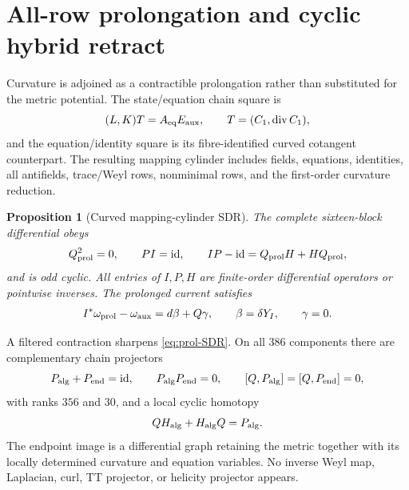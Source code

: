 \documentclass[11pt]{article}
\newtheorem{proposition}[theorem]{Proposition}
\theoremstyle{definition}
\theoremstyle{remark}
\newcommand{\id}{\mathrm{id}}
\begin{document}
\section{All-row prolongation and cyclic hybrid retract}
\label{sec:mapping-cylinder}

Curvature is adjoined as a contractible prolongation rather than substituted
for the metric potential.  The state/equation chain square is
\begin{equation}\label{eq:chain-square}
 (L,K)T=A_{\rm eq}E_{\rm aux},
 \qquad T=(C_1,\operatorname{div}C_1),
\end{equation}
and the equation/identity square is its fibre-identified curved cotangent
counterpart.  The resulting mapping cylinder includes fields, equations,
identities, all antifields, trace/Weyl rows, nonminimal rows, and the
first-order curvature reduction.

\begin{proposition}[Curved mapping-cylinder SDR]\label{prop:cylinder-SDR}
The complete sixteen-block differential obeys
\begin{equation}\label{eq:prol-SDR}
 Q_{\rm prol}^2=0,
 \qquad PI=\id,
 \qquad IP-\id=Q_{\rm prol}H+HQ_{\rm prol},
\end{equation}
and is odd cyclic.  All entries of $I,P,H$ are finite-order differential
operators or pointwise inverses.  The prolonged current satisfies
\begin{equation}\label{eq:prolonged-current}
 I^*\omega_{\rm prol}-\omega_{\rm aux}=d\beta+Q\gamma,
 \qquad \beta=\delta Y_I,
 \qquad \gamma=0.
\end{equation}
\end{proposition}

A filtered contraction sharpens \eqref{eq:prol-SDR}.  On all $386$
components there are complementary chain projectors
\begin{equation}\label{eq:hybrid-projectors}
 P_{\rm alg}+P_{\rm end}=\id,
 \qquad P_{\rm alg}P_{\rm end}=0,
 \qquad [Q,P_{\rm alg}]=[Q,P_{\rm end}]=0,
\end{equation}
with ranks $356$ and $30$, and a local cyclic homotopy
\begin{equation}\label{eq:alg-contraction}
 QH_{\rm alg}+H_{\rm alg}Q=P_{\rm alg}.
\end{equation}
The endpoint image is a differential graph retaining the metric together
with its locally determined curvature and equation variables.  No inverse
Weyl map, Laplacian, curl, TT projector, or helicity projector appears.
\end{document}
